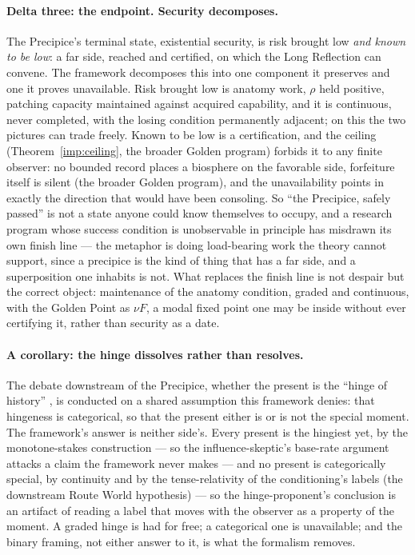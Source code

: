 \documentclass[11pt]{article}
\theoremstyle{plain}
\theoremstyle{definition}
\theoremstyle{remark}
\begin{document}
\paragraph{Delta three: the endpoint. Security decomposes.} The
Precipice's terminal state, existential security, is risk
brought low \emph{and known to be low}: a far side, reached and
certified, on which the Long Reflection can convene. The framework
decomposes this into one component it preserves and one it proves
unavailable. Risk brought low is anatomy work, $\rho$ held
positive, patching capacity maintained against acquired capability, and it is continuous, never completed, with the losing condition
permanently adjacent; on this the two pictures can trade freely.
Known to be low is a certification, and the ceiling
(Theorem~\ref{imp:ceiling}, the broader Golden program)
forbids it to any finite observer: no bounded record places a
biosphere on the favorable side, forfeiture itself is silent
(the broader Golden program), and the unavailability points in
exactly the direction that would have been consoling. So ``the
Precipice, safely passed'' is not a state anyone could know themselves
to occupy, and a research program whose success condition is
unobservable in principle has misdrawn its own finish line --- the
metaphor is doing load-bearing work the theory cannot support, since a
precipice is the kind of thing that has a far side, and a
superposition one inhabits is not. What replaces the finish line is
not despair but the correct object: maintenance of the anatomy
condition, graded and continuous, with the Golden Point as
$\nu F$, a modal fixed point one may be inside without ever
certifying it, rather than security as a date.

\paragraph{A corollary: the hinge dissolves rather than resolves.}
The debate downstream of the Precipice, whether the present is the
``hinge of history'' \cite{MacAskill22, GM21}, is conducted on a
shared assumption this framework denies: that hingeness is
categorical, so that the present either is or is not the special
moment. The framework's answer is neither side's. Every present is the
hingiest yet, by the monotone-stakes construction --- so the
influence-skeptic's base-rate argument attacks a claim the framework
never makes --- and no present is categorically special, by
continuity and by the tense-relativity of the conditioning's labels
(the downstream Route World hypothesis) --- so the hinge-proponent's
conclusion is an artifact of reading a label that moves with the
observer as a property of the moment. A graded hinge is had for free;
a categorical one is unavailable; and the binary framing, not either
answer to it, is what the formalism removes.
\end{document}
